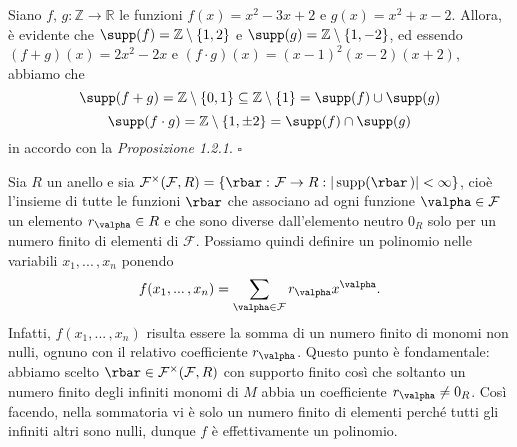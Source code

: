 \begin{exm}Siano $f,\,g\colon \mathbb{Z}\to\mathbb{R}$ le funzioni $f(x)=x^2-3x+2$ e $g(x)=x^2+x-2$. Allora, è evidente che $\supp(f)=\mathbb{Z}\setminus\{ 1,2\}$ e $\supp(g)=\mathbb{Z}\setminus \{ 1,-2 \}$, ed essendo $(f+g)(x)=2x^2-2x$ e $(f\cdot g)(x)=(x-1)^2(x-2)(x+2)$, abbiamo che $$\supp(f+g)=\mathbb{Z}\setminus\{0,1\}\subseteq \mathbb{Z}\setminus\{1\} = \supp(f)\cup\supp(g)$$ $$\supp(f\cdot g)=\mathbb{Z}\setminus \{1,\pm 2\} = \supp(f)\cap\supp(g)$$ in accordo con la \emph{Proposizione 1.2.1}. $\square$\end{exm}

\noindent Sia $R$ un anello e sia $\mathcal{F}^{\times}(\mathcal{F},R)=\left\{ \rbar\,\colon \mathcal{F}\to R : |\operatorname{supp}(\rbar\,)|<\infty \right\}$, cioè l'insieme di tutte le funzioni $\rbar$ che associano ad ogni funzione $\valpha\in\mathcal{F}$ un elemento $r_{\valpha}\in R$ e che sono diverse dall'elemento neutro $0_R$ solo per un numero finito di elementi di $\mathcal{F}$. Possiamo quindi definire un polinomio nelle variabili $x_1,...\,,x_n$ ponendo \[ f(x_1,...\,,x_n)=\sum\limits_{\valpha\in \mathcal{F}}r_{\valpha} x^{\valpha}.\] Infatti, $f(x_1,...\,,x_n)$ risulta essere la somma di un numero finito di monomi non nulli, ognuno con il relativo coefficiente $r_{\valpha}$. Questo punto è fondamentale: abbiamo scelto $\rbar \in \mathcal{F}^{\times}(\mathcal{F},R)$ con supporto finito così che soltanto un numero finito degli infiniti monomi di $M$ abbia un coefficiente $r_{\valpha}\neq 0_R$. Così facendo, nella sommatoria vi è solo un numero finito di elementi perché tutti gli infiniti altri sono nulli, dunque $f$ è effettivamente un polinomio.


